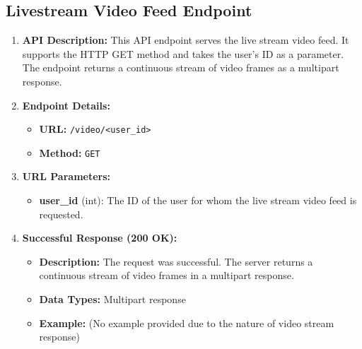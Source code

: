 \documentclass[a4 paper, 12pt]{article}
\begin{document}
\subsection{Livestream Video Feed Endpoint}

\begin{enumerate}
  \item \textbf{API Description:} This API endpoint serves the live stream video feed. It supports the HTTP GET method and takes the user's ID as a parameter. The endpoint returns a continuous stream of video frames as a multipart response.

  \item \textbf{Endpoint Details:}
  \begin{itemize}
    \item \textbf{URL:} \texttt{/video/<user\_id>}
    \item \textbf{Method:} \texttt{GET}
  \end{itemize}

  \item \textbf{URL Parameters:}
  \begin{itemize}
    \item \textbf{user\_id} (int): The ID of the user for whom the live stream video feed is requested.
  \end{itemize}

  \item \textbf{Successful Response (200 OK):}
  \begin{itemize}
    \item \textbf{Description:} The request was successful. The server returns a continuous stream of video frames in a multipart response.
    \item \textbf{Data Types:} Multipart response
    \item \textbf{Example:} (No example provided due to the nature of video stream response)
  \end{itemize}
\end{enumerate}
\end{document}
